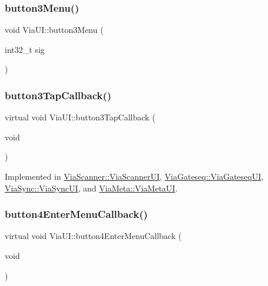 \mbox{\label{class_via_u_i_a4c6811c74f2c1cfadd84be925ed905fc}} 
\subsubsection{\texorpdfstring{button3\+Menu()}{button3Menu()}}
{\footnotesize\ttfamily void Via\+U\+I\+::button3\+Menu (\begin{DoxyParamCaption}\item[{int32\+\_\+t}]{sig }\end{DoxyParamCaption})}

\mbox{\label{class_via_u_i_a3dfd40d901aaa8c8310bdbf75f4432a5}} 
\subsubsection{\texorpdfstring{button3\+Tap\+Callback()}{button3TapCallback()}}
{\footnotesize\ttfamily virtual void Via\+U\+I\+::button3\+Tap\+Callback (\begin{DoxyParamCaption}\item[{void}]{ }\end{DoxyParamCaption})\hspace{0.3cm}{\ttfamily [pure virtual]}}



Implemented in \mbox{\hyperlink{class_via_scanner_1_1_via_scanner_u_i_ac4c5b6ba60ade672ebe768c9d4849d62}{Via\+Scanner\+::\+Via\+Scanner\+UI}}, \mbox{\hyperlink{class_via_gateseq_1_1_via_gateseq_u_i_abce5bbab2316b9c0bc3cfedbaaeeef73}{Via\+Gateseq\+::\+Via\+Gateseq\+UI}}, \mbox{\hyperlink{class_via_sync_1_1_via_sync_u_i_ad51f33a8fd5ae243997f864436dadcae}{Via\+Sync\+::\+Via\+Sync\+UI}}, and \mbox{\hyperlink{class_via_meta_1_1_via_meta_u_i_a67e200e126a39d85d79f1f81f25e48a5}{Via\+Meta\+::\+Via\+Meta\+UI}}.

\mbox{\label{class_via_u_i_a6db24e53e559b6fddd4cb1f918de40d6}} 
\subsubsection{\texorpdfstring{button4\+Enter\+Menu\+Callback()}{button4EnterMenuCallback()}}
{\footnotesize\ttfamily virtual void Via\+U\+I\+::button4\+Enter\+Menu\+Callback (\begin{DoxyParamCaption}\item[{void}]{ }\end{DoxyParamCaption})\hspace{0.3cm}{\ttfamily [pure virtual]}}



